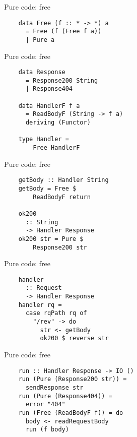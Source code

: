 \documentclass[20pt]{beamer}
\begin{document}
\begin{frame}[fragile]{Pure code: free}
    \begin{lstlisting}
    data Free (f :: * -> *) a
      = Free (f (Free f a))
      | Pure a
    \end{lstlisting}
\end{frame}

\begin{frame}[fragile]{Pure code: free}
    \begin{lstlisting}
    data Response
      = Response200 String
      | Response404

    data HandlerF f a
      = ReadBodyF (String -> f a)
      deriving (Functor)

    type Handler =
        Free HandlerF
    \end{lstlisting}
\end{frame}

\begin{frame}[fragile]{Pure code: free}
    \begin{lstlisting}
    getBody :: Handler String
    getBody = Free $
        ReadBodyF return

    ok200
      :: String
      -> Handler Response
    ok200 str = Pure $
        Response200 str
    \end{lstlisting}
\end{frame}

\begin{frame}[fragile]{Pure code: free}
    \begin{lstlisting}
    handler
      :: Request
      -> Handler Response
    handler rq =
      case rqPath rq of
        "/rev" -> do
          str <- getBody
          ok200 $ reverse str
    \end{lstlisting}
\end{frame}

\begin{frame}[fragile]{Pure code: free}
    \begin{lstlisting}
    run :: Handler Response -> IO ()
    run (Pure (Response200 str)) =
      sendResponse str
    run (Pure (Response404)) =
      error "404"
    run (Free (ReadBodyF f)) = do
      body <- readRequestBody
      run (f body)
    \end{lstlisting}
\end{frame}
\end{document}
